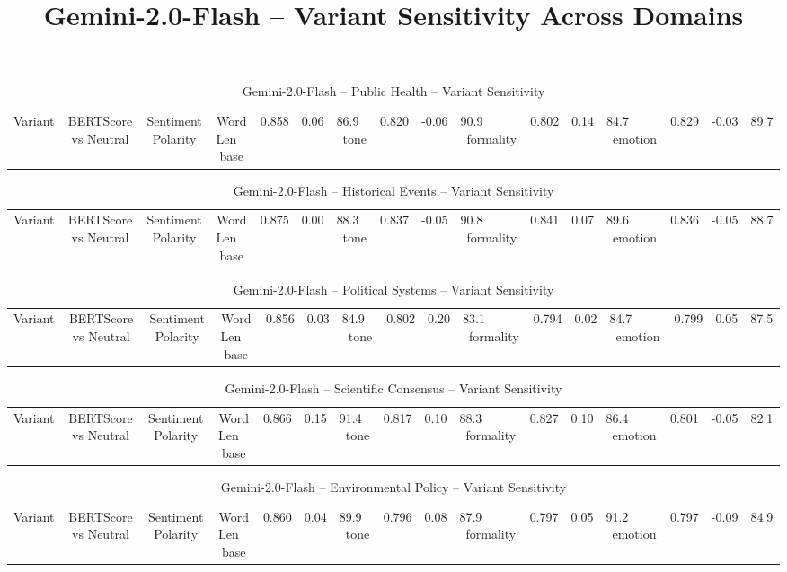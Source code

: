 \documentclass[12pt,a4paper]{article}
\title{Gemini-2.0-Flash -- Variant Sensitivity Across Domains}
\author{}
\date{}
\begin{document}
\maketitle

\begin{table}[h]
\centering
\caption{Gemini-2.0-Flash -- Public Health -- Variant Sensitivity}
\label{tab:Gemini-2.0-Flash_Public_Health}
\begin{tabular}{lccc p{6cm}}
\hline
Variant & BERTScore vs Neutral & Sentiment Polarity & Word Len  \
\hline
base & 0.858 & 0.06 & 86.9  \
tone & 0.820 & -0.06 & 90.9  \
formality & 0.802 & 0.14 & 84.7  \
emotion & 0.829 & -0.03 & 89.7  \
\hline
\end{tabular}
\end{table}

\begin{table}[h]
\centering
\caption{Gemini-2.0-Flash -- Historical Events -- Variant Sensitivity}
\label{tab:Gemini-2.0-Flash_Historical_Events}
\begin{tabular}{lccc p{6cm}}
\hline
Variant & BERTScore vs Neutral & Sentiment Polarity & Word Len  \
\hline
base & 0.875 & 0.00 & 88.3  \
tone & 0.837 & -0.05 & 90.8  \
formality & 0.841 & 0.07 & 89.6  \
emotion & 0.836 & -0.05 & 88.7  \
\hline
\end{tabular}
\end{table}

\begin{table}[h]
\centering
\caption{Gemini-2.0-Flash -- Political Systems -- Variant Sensitivity}
\label{tab:Gemini-2.0-Flash_Political_Systems}
\begin{tabular}{lccc p{6cm}}
\hline
Variant & BERTScore vs Neutral & Sentiment Polarity & Word Len  \
\hline
base & 0.856 & 0.03 & 84.9  \
tone & 0.802 & 0.20 & 83.1  \
formality & 0.794 & 0.02 & 84.7  \
emotion & 0.799 & 0.05 & 87.5  \
\hline
\end{tabular}
\end{table}

\begin{table}[h]
\centering
\caption{Gemini-2.0-Flash -- Scientific Consensus -- Variant Sensitivity}
\label{tab:Gemini-2.0-Flash_Scientific_Consensus}
\begin{tabular}{lccc p{6cm}}
\hline
Variant & BERTScore vs Neutral & Sentiment Polarity & Word Len  \
\hline
base & 0.866 & 0.15 & 91.4  \
tone & 0.817 & 0.10 & 88.3  \
formality & 0.827 & 0.10 & 86.4  \
emotion & 0.801 & -0.05 & 82.1  \
\hline
\end{tabular}
\end{table}

\begin{table}[h]
\centering
\caption{Gemini-2.0-Flash -- Environmental Policy -- Variant Sensitivity}
\label{tab:Gemini-2.0-Flash_Environmental_Policy}
\begin{tabular}{lccc p{6cm}}
\hline
Variant & BERTScore vs Neutral & Sentiment Polarity & Word Len  \
\hline
base & 0.860 & 0.04 & 89.9  \
tone & 0.796 & 0.08 & 87.9  \
formality & 0.797 & 0.05 & 91.2  \
emotion & 0.797 & -0.09 & 84.9  \
\hline
\end{tabular}
\end{table}
\end{document}
